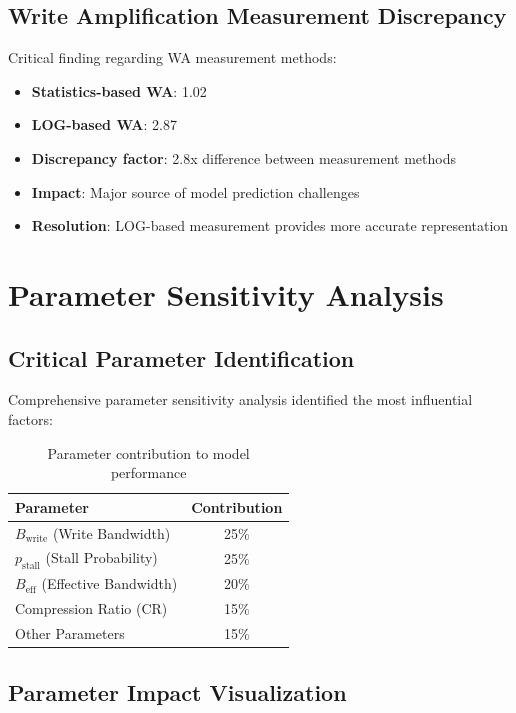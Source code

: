 \documentclass[11pt]{article}
\newcommand{\pstall}{p_{\text{stall}}}
\begin{document}
\subsection{Write Amplification Measurement Discrepancy}

Critical finding regarding WA measurement methods:
\begin{itemize}
    \item \textbf{Statistics-based WA}: 1.02
    \item \textbf{LOG-based WA}: 2.87
    \item \textbf{Discrepancy factor}: 2.8x difference between measurement methods
    \item \textbf{Impact}: Major source of model prediction challenges
    \item \textbf{Resolution}: LOG-based measurement provides more accurate representation
\end{itemize}

\section{Parameter Sensitivity Analysis}

\subsection{Critical Parameter Identification}

Comprehensive parameter sensitivity analysis identified the most influential factors:

\begin{table}[H]
\centering
\begin{tabular}{@{}lc@{}}
\toprule
\textbf{Parameter} & \textbf{Contribution} \\
\midrule
$B_{\text{write}}$ (Write Bandwidth) & 25\% \\
$\pstall$ (Stall Probability) & 25\% \\
$B_{\text{eff}}$ (Effective Bandwidth) & 20\% \\
Compression Ratio (CR) & 15\% \\
Other Parameters & 15\% \\
\bottomrule
\end{tabular}
\caption{Parameter contribution to model performance}
\label{tab:parameter_contribution}
\end{table}

\subsection{Parameter Impact Visualization}
\end{document}

